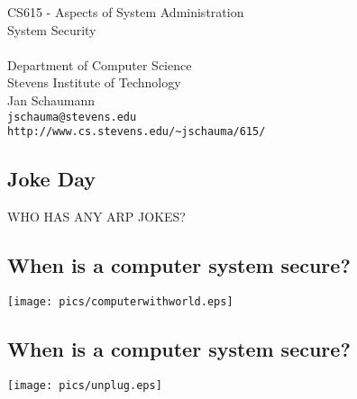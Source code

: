 \documentclass[xga]{xdvislides}
\begin{document}
\setfontphv

\lhead{\slidetitle}                               %
\cfoot{\relax}                               %
\rfoot{\Gray{\today}}
\vspace*{\fill}
\begin{center}
	\Hugesize
		CS615 - Aspects of System Administration\\ [1em]
		System Security\\ [1em]
	\hspace*{5mm}\blueline\\ [1em]
	\Normalsize
		Department of Computer Science\\
		Stevens Institute of Technology\\
		Jan Schaumann\\
		\verb+jschauma@stevens.edu+ \\
		\verb+http://www.cs.stevens.edu/~jschauma/615/+
\end{center}
\vspace*{\fill}

\subsection{Joke Day}
\vspace*{\fill}
\begin{center}
\Huge
WHO HAS ANY ARP JOKES?
\Normalsize
\end{center}
\vspace*{\fill}

\subsection{When is a computer system secure?}
\vspace*{\fill}
\begin{center}
	\texttt{[image: pics/computerwithworld.eps]}
\end{center}
\vspace*{\fill}

\subsection{When is a computer system secure?}
\vspace*{\fill}
\begin{center}
	\texttt{[image: pics/unplug.eps]}
\end{center}
\vspace*{\fill}
\end{document}
